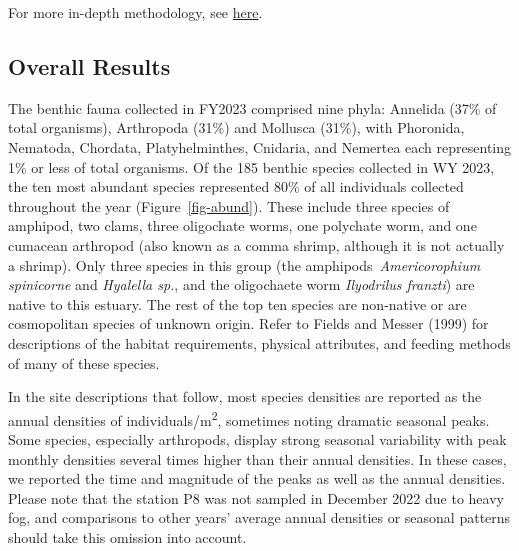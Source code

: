 \documentclass[
]{article}
\begin{document}
For more in-depth methodology, see
\href{https://portal.edirepository.org/nis/metadataviewer?packageid=edi.1320.6}{here}.

\hypertarget{overall-results}{%
\subsection{Overall Results}\label{overall-results}}

The benthic fauna collected in FY2023 comprised nine phyla: Annelida
(37\% of total organisms), Arthropoda (31\%) and Mollusca (31\%), with
Phoronida, Nematoda, Chordata, Platyhelminthes, Cnidaria, and Nemertea
each representing 1\% or less of total organisms. Of the 185 benthic
species collected in WY 2023, the ten most abundant species represented
80\% of all individuals collected throughout the year
(Figure~\ref{fig-abund}). These include three species of amphipod, two
clams, three oligochate worms, one polychate worm, and one cumacean
arthropod (also known as a comma shrimp, although it is not actually a
shrimp). Only three species in this group (the
amphipods~\emph{Americorophium spinicorne} and \emph{Hyalella sp.}, and
the oligochaete worm \emph{Ilyodrilus franzti}) are native to this
estuary. The rest of the top ten species are non-native or are
cosmopolitan species of unknown origin. Refer to Fields and Messer
(1999) for descriptions of the habitat requirements, physical
attributes, and feeding methods of many of these species.

In the site descriptions that follow, most species densities are
reported as the annual densities of individuals/m\textsuperscript{2},
sometimes noting dramatic seasonal peaks. Some species, especially
arthropods, display strong seasonal variability with peak monthly
densities several times higher than their annual densities. In these
cases, we reported the time and magnitude of the peaks as well as the
annual densities. Please note that the station P8 was not sampled in
December 2022 due to heavy fog, and comparisons to other years' average
annual densities or seasonal patterns should take this omission into
account.
\end{document}
